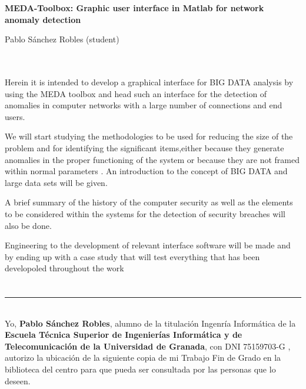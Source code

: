 \cleardoublepage


\thispagestyle{empty}


\begin{center}
{\large\bfseries MEDA-Toolbox: Graphic user interface in Matlab for network anomaly detection}\\
\end{center}
\begin{center}
Pablo Sánchez Robles (student)\\
\end{center}

\\

\vspace{0.7cm}
\\

Herein it is intended to develop a graphical interface for BIG DATA analysis by using the MEDA toolbox and head such an  interface for the detection of anomalies in computer networks with a large number of connections and end users.
\bigskip

We will start studying the methodologies to be used for reducing the size of the problem and for identifying the significant items,either because they generate anomalies in the proper functioning of the system or because they are not framed within  normal parameters . An  introduction to the concept of BIG DATA and large data sets will be given.
\bigskip

A brief summary of the history of the computer security as well as the elements to be considered within the systems for the detection of security breaches will also be done.
\bigskip

Engineering to the development of   relevant interface software will be made and  by ending up with a case study that  will test everything  that has been  developoled throughout the work
\bigskip

\chapter*{}
\thispagestyle{empty}

\noindent\rule[-1ex]{\textwidth}{2pt}\\[4.5ex]

Yo, \textbf{Pablo Sánchez Robles}, alumno de la titulación Ingenría Informática de la \textbf{Escuela Técnica Superior
de Ingenierías Informática y de Telecomunicación de la Universidad de Granada}, con DNI 75159703-G , autorizo la
ubicación de la siguiente copia de mi Trabajo Fin de Grado en la biblioteca del centro para que pueda ser
consultada por las personas que lo deseen.


